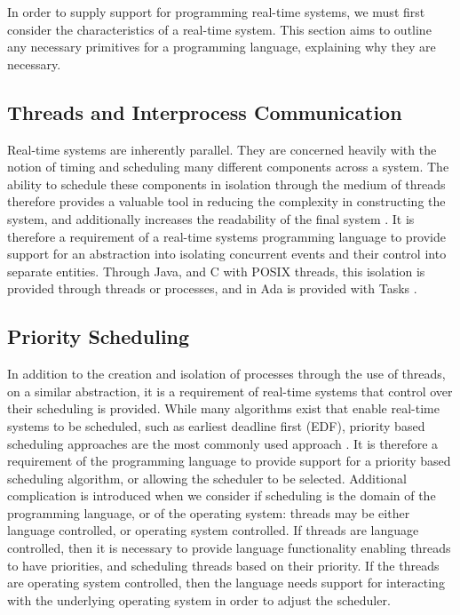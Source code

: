 In order to supply support for programming real-time systems, we must first 
consider the characteristics of a real-time system. This section aims to outline
any necessary primitives for a programming language, explaining why they are 
necessary. 

\subsection{Threads and Interprocess Communication}
Real-time systems are inherently parallel. They are concerned heavily with 
the notion of timing and scheduling many different components across a system. 
The ability to schedule these components in isolation through the medium 
of threads therefore provides a valuable tool in reducing the complexity in 
constructing the system, and additionally increases the readability of the 
final system 
\cite{BURNS +WELLING p132}. It is therefore a requirement of a real-time systems 
programming language to provide support for an abstraction into isolating 
concurrent events and their control into separate entities. Through Java, and 
C with POSIX threads, this isolation is provided through threads or processes, 
and in Ada is provided with Tasks 
\cite{books.google.co.uk/books?id=ZDRBv8U_bJ0C&pg=PA251}.

\subsection{Priority Scheduling}
In addition to the creation and isolation of processes through the use of 
threads, on a similar abstraction, it is a requirement of real-time systems 
that control over their scheduling is provided. 
While many algorithms exist that enable real-time systems to be scheduled, such 
as earliest deadline first (EDF), priority based scheduling approaches are the 
most commonly used approach 
\cite{http://research.cs.queensu.ca/home/akl/techreports/scheduling.pdf}. 
It is therefore a requirement of the programming language to provide support 
for a priority based scheduling algorithm, or allowing the scheduler to be 
selected. Additional complication is introduced when we consider if scheduling 
is the domain of the programming language, or of the operating system:
threads may be either language controlled, or operating system controlled. 
If threads are language controlled, then it is necessary to provide 
language functionality enabling threads to have priorities, and scheduling threads 
based on their priority.
If the threads are operating system controlled, then the language needs 
support for interacting with the underlying operating system in order to 
adjust the scheduler. 

